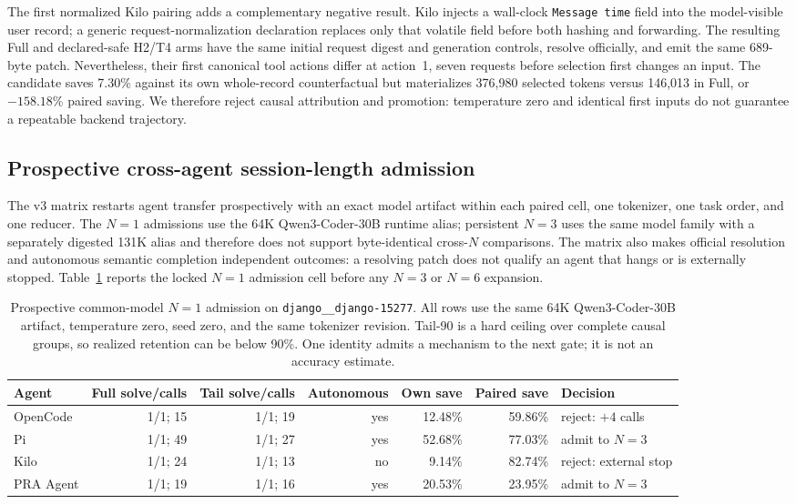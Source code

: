 \documentclass[11pt]{article}
\begin{document}
The first normalized Kilo pairing adds a complementary negative result.  Kilo
injects a wall-clock \texttt{Message time} field into the model-visible user
record; a generic request-normalization declaration replaces only that
volatile field before both hashing and forwarding.  The resulting Full and
declared-safe H2/T4 arms have the same initial request digest and generation
controls, resolve officially, and emit the same 689-byte patch.  Nevertheless,
their first canonical tool actions differ at action~1, seven requests before
selection first changes an input.  The candidate saves 7.30\% against its own
whole-record counterfactual but materializes 376,980 selected tokens versus
146,013 in Full, or $-158.18$\% paired saving.  We therefore reject causal
attribution and promotion: temperature zero and identical first inputs do not
guarantee a repeatable backend trajectory.

\subsection{Prospective cross-agent session-length admission}

The v3 matrix restarts agent transfer prospectively with an exact model artifact
within each paired cell, one tokenizer, one task order, and one reducer.  The
$N=1$ admissions use the 64K Qwen3-Coder-30B runtime alias; persistent $N=3$
uses the same model family with a separately digested 131K alias and therefore
does not support byte-identical cross-$N$ comparisons.  The matrix also makes official resolution and
autonomous semantic completion independent outcomes: a resolving patch does
not qualify an agent that hangs or is externally stopped.  Table~\ref{tab:agent-n1-v3}
reports the locked $N=1$ admission cell before any $N=3$ or $N=6$ expansion.

\begin{table}[H]
\centering
\scriptsize
\setlength{\tabcolsep}{4pt}
\begin{tabular}{lrrrrrl}
\toprule
Agent & Full solve/calls & Tail solve/calls & Autonomous & Own save & Paired save & Decision \\
\midrule
OpenCode & 1/1; 15 & 1/1; 19 & yes & 12.48\% & 59.86\% & reject: $+4$ calls \\
Pi & 1/1; 49 & 1/1; 27 & yes & 52.68\% & 77.03\% & admit to $N=3$ \\
Kilo & 1/1; 24 & 1/1; 13 & no & 9.14\% & 82.74\% & reject: external stop \\
PRA Agent & 1/1; 19 & 1/1; 16 & yes & 20.53\% & 23.95\% & admit to $N=3$ \\
\bottomrule
\end{tabular}
\caption{Prospective common-model $N=1$ admission on
\texttt{django\_\_django-15277}.  All rows use the same 64K
Qwen3-Coder-30B artifact, temperature
zero, seed zero, and the same tokenizer revision.  Tail-90 is a hard ceiling
over complete causal groups, so realized retention can be below 90\%.  One
identity admits a mechanism to the next gate; it is not an accuracy estimate.}
\label{tab:agent-n1-v3}
\end{table}
\end{document}
